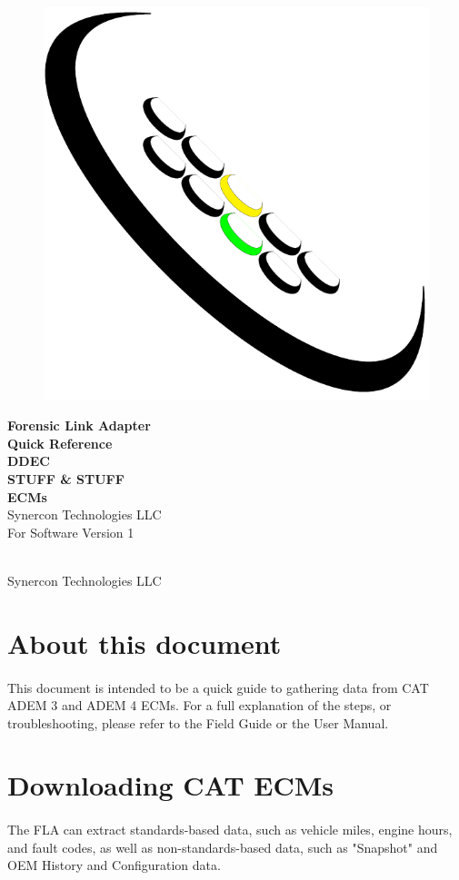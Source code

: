 \documentclass[11pt]{article}
\newcommand*{\titleGP}{\begingroup %
\centering %
\vspace*{\baselineskip} %
\begin{figure}[tbph]
\centering
\includegraphics[width=0.15\linewidth]{../../media/logos/synercon_logo_v3_only}
\end{figure}
{\Huge \textbf{Forensic Link Adapter \\Quick Reference}}\\[2\baselineskip] %
{\Huge \textbf{DDEC \\STUFF \& STUFF \\[.4cm] ECMs}}\\[2\baselineskip] %
{\Huge Synercon Technologies LLC}\\[2\baselineskip]
{\Large For Software Version 1}\\[3cm]

\tableofcontents
\vfill %


\textcopyright {\scshape 2015} \\[0.3\baselineskip] %
Synercon Technologies LLC

\endgroup}
\begin{document}







\titleGP %

\newpage
\section{About this document}
\paragraph{  }
This document is intended to be a quick guide to gathering data from CAT ADEM 3 and ADEM 4 ECMs. For a full explanation of the steps, or troubleshooting, please refer to the Field Guide or the User Manual.

\section{Downloading CAT ECMs}
\paragraph{  }
The FLA can extract standards-based data, such as vehicle miles, engine hours, and fault codes, as well as non-standards-based data, such as "Snapshot" and OEM History and Configuration data.
\end{document}
